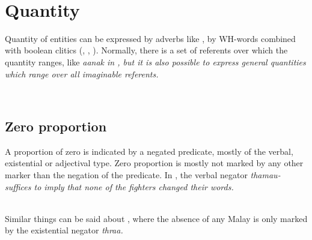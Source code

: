  \\
\section{Quantity}\label{sec:func:Quantity}
Quantity of entities can be expressed by adverbs like , by WH-words combined with boolean clitics (,  , ).
Normally, there is a set of referents over which the quantity ranges, like \em aanak \em in , but it is also possible to express general quantities which range over all imaginable referents.


 \\



\subsection{Zero proportion}\label{sec:func:Zeroproportion}
A proportion of zero is indicated by a negated predicate, mostly of the verbal, existential or adjectival type. Zero proportion is mostly not marked by any other marker than the negation of the predicate. In , the verbal negator \em thamau- \em suffices to imply that none of the fighters changed their words.


 \\
Similar things can be said about , where the absence of any Malay is only marked by the existential negator \em thraa\em.

